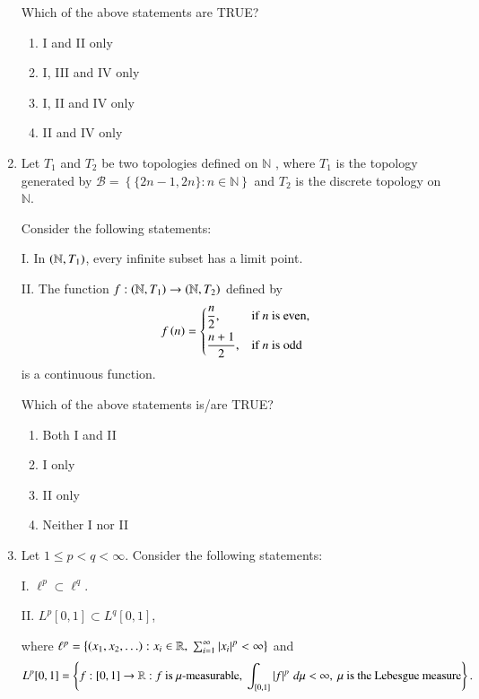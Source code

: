 \documentclass[journal,12pt,onecolumn]{IEEEtran}
\theoremstyle{remark}
\begin{document}
\begin{enumerate}[start=1, label=Q.\arabic*]
Which of the above statements are TRUE?
\begin{enumerate}
\item I and II only
\item I, III and IV only
\item I, II and IV only
\item II and IV only
\end{enumerate}

\hfill{}
\item Let $T_{1}$ and $T_{2}$ be two topologies defined on $\mathbb{N}$ , where $T_{1}$ is the topology generated by $\mathcal{B}=\left\{\{2n-1,2n\}: n\in\mathbb{N}\right\}$ and $T_{2}$ is the discrete topology on $\mathbb{N}$.  

Consider the following statements:  

I. In $\left(\mathbb{N},T_{1}\right)$, every infinite subset has a limit point.  

II. The function $f: \left(\mathbb{N},T_{1}\right)\to \left(\mathbb{N},T_{2}\right)$ defined by
\[
f\left(n\right)=\begin{cases}
\dfrac{n}{2}, & \text{if $n$ is even},\\[6pt]
\dfrac{n+1}{2}, & \text{if $n$ is odd}
\end{cases}
\]
is a continuous function.  

Which of the above statements is/are TRUE?
\begin{enumerate}
\item Both I and II
\item I only
\item II only
\item Neither I nor II
\end{enumerate}

\hfill{}


\item Let $1\le p<q<\infty$. Consider the following statements:  

I. $\ell^{p} \subset \ell^{q}$.  

II. $L^{p}[0,1]\subset L^{q}[0,1]$,  

where $\ell^{p}=\left\{ \left(x_{1},x_{2},\ldots\right): x_{i}\in\mathbb{R},\ \sum_{i=1}^{\infty} \left\vert x_{i}\right\vert^{p}<\infty \right\}$ and
\[
L^{p}[0,1]=\left\{ f: [0,1]\to\mathbb{R}: f \text{ is $\mu$-measurable},\ \int_{[0,1]} \left\vert f\right\vert^{p}\, d\mu < \infty,\ \mu \text{ is the Lebesgue measure} \right\}.
\]


\end{enumerate}
\end{document}
